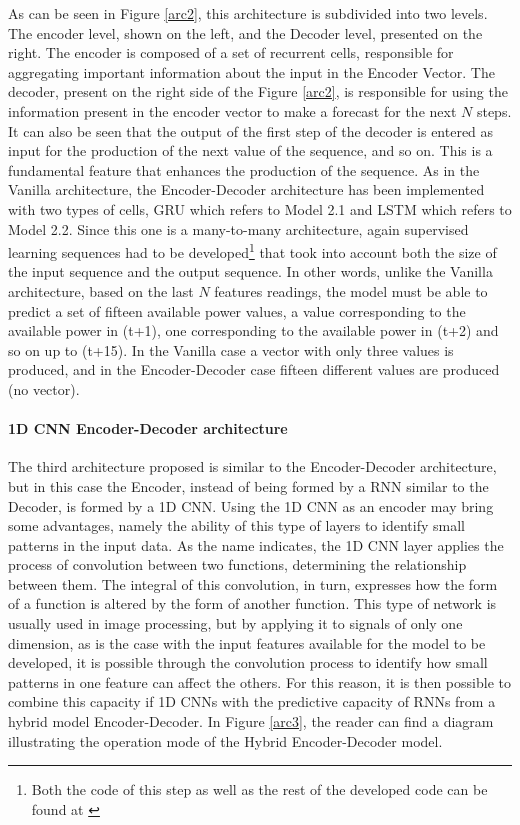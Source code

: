 As can be seen in Figure \ref{arc2}, this architecture is subdivided into two levels. The encoder level, shown on the left, and the Decoder level, presented on the right. The encoder is composed of a set of recurrent cells, responsible for aggregating important information about the input in the Encoder Vector. The decoder, present on the right side of the Figure \ref{arc2}, is responsible for using the information present in the encoder vector to make a forecast for the next $N$ steps. It can also be seen that the output of the first step of the decoder is entered as input for the production of the next value of the sequence, and so on. This is a fundamental feature that enhances the production of the sequence. As in the Vanilla architecture, the Encoder-Decoder architecture has been implemented with two types of cells, \ac{GRU} which refers to Model 2.1 and \ac{LSTM} which refers to Model 2.2. Since this one is a many-to-many architecture, again supervised learning sequences had to be developed\footnote{Both the code of this step as well as the rest of the developed code can be found at \cite{code}} that took into account both the size of the input sequence and the output sequence. In other words, unlike the Vanilla architecture, based on the last $N$ features readings, the model must be able to predict a set of fifteen available power values, a value corresponding to the available power in (t+1), one corresponding to the available power in (t+2) and so on up to (t+15). In the Vanilla case a vector with only three values is produced, and in the Encoder-Decoder case fifteen different values are produced (no vector).




\paragraph{1D CNN Encoder-Decoder architecture}


The third architecture proposed is similar to the Encoder-Decoder architecture, but in this case the Encoder, instead of being formed by a \ac{RNN} similar to the Decoder, is formed by a \ac{1D CNN}. Using the \ac{1D CNN} as an encoder may bring some advantages, namely the ability of this type of layers to identify small patterns in the input data. As the name indicates, the \ac{1D CNN} layer applies the process of convolution between two functions, determining the relationship between them. The integral of this convolution, in turn, expresses how the form of a function is altered by the form of another function. This type of network is usually used in image processing, but by applying it to signals of only one dimension, as is the case with the input features available for the model to be developed, it is possible through the convolution process to identify how small patterns in one feature can affect the others. For this reason, it is then possible to combine this capacity if \ac{1D CNN}s with the predictive capacity of \ac{RNN}s from a hybrid model Encoder-Decoder. In Figure \ref{arc3}, the reader can find a diagram illustrating the operation mode of the Hybrid Encoder-Decoder model.

